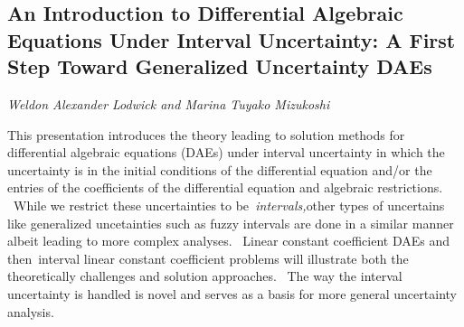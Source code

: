 \documentclass[../booklet.tex]{subfiles}
\begin{document}
\subsection[An Introduction to Differential Algebraic Equations Under Interval Uncertainty: A First Step Toward Generalized Uncertainty DAEs. {\it Weldon Alexander Lodwick and Marina Tuyako Mizukoshi}]{An Introduction to Differential Algebraic Equations Under Interval Uncertainty: A First Step Toward Generalized Uncertainty DAEs}
 

\begin{center}
  {\it Weldon Alexander Lodwick and Marina Tuyako Mizukoshi}
\end{center}



This presentation introduces the theory leading to solution methods for
differential algebraic equations (DAEs) under interval uncertainty in which
the uncertainty is in the initial conditions of the differential equation
and/or the entries of the coefficients of the differential equation and
algebraic restrictions. \ While we restrict these uncertainties to
be\textit{\ intervals,}other types of uncertains like generalized uncetainties
such as fuzzy intervals are done in a similar manner albeit leading to more
complex analyses. \ Linear constant coefficient DAEs and then\ interval linear
constant coefficient problems will illustrate both the theoretically
challenges and solution approaches. \ The way the interval uncertainty is
handled is novel and serves as a basis for more general uncertainty analysis.

\end{document}
